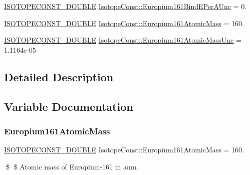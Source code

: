 \begin{DoxyCompactItemize}
\mbox{\hyperlink{group___isotope_const-_macros_ga8f45a7272ce02c0b4c65c44636ed719a}{I\+S\+O\+T\+O\+P\+E\+C\+O\+N\+S\+T\+\_\+\+D\+O\+U\+B\+LE}} \mbox{\hyperlink{group___isotope_const-_europium-_eu161_gabe1956ef06d95b07f8c745e7cac36c29}{Isotope\+Const\+::\+Europium161\+Bind\+E\+Per\+A\+Unc}} = 0.
\item 
\mbox{\hyperlink{group___isotope_const-_macros_ga8f45a7272ce02c0b4c65c44636ed719a}{I\+S\+O\+T\+O\+P\+E\+C\+O\+N\+S\+T\+\_\+\+D\+O\+U\+B\+LE}} \mbox{\hyperlink{group___isotope_const-_europium-_eu161_ga5163dd3b88903f5e163bbc856448e485}{Isotope\+Const\+::\+Europium161\+Atomic\+Mass}} = 160.
\item 
\mbox{\hyperlink{group___isotope_const-_macros_ga8f45a7272ce02c0b4c65c44636ed719a}{I\+S\+O\+T\+O\+P\+E\+C\+O\+N\+S\+T\+\_\+\+D\+O\+U\+B\+LE}} \mbox{\hyperlink{group___isotope_const-_europium-_eu161_ga7407bee52b227a85fc6d69d0e1f6ead3}{Isotope\+Const\+::\+Europium161\+Atomic\+Mass\+Unc}} = 1.\+1164e-\/05
\end{DoxyCompactItemize}


\subsection{Detailed Description}


\subsection{Variable Documentation}
\mbox{\label{group___isotope_const-_europium-_eu161_ga5163dd3b88903f5e163bbc856448e485}} 
\subsubsection{\texorpdfstring{Europium161\+Atomic\+Mass}{Europium161AtomicMass}}
{\footnotesize\ttfamily \mbox{\hyperlink{group___isotope_const-_macros_ga8f45a7272ce02c0b4c65c44636ed719a}{I\+S\+O\+T\+O\+P\+E\+C\+O\+N\+S\+T\+\_\+\+D\+O\+U\+B\+LE}} Isotope\+Const\+::\+Europium161\+Atomic\+Mass = 160.}

\$ \$ Atomic mass of Europium-\/161 in amu. \mbox{\label{group___isotope_const-_europium-_eu161_ga7407bee52b227a85fc6d69d0e1f6ead3}} 
